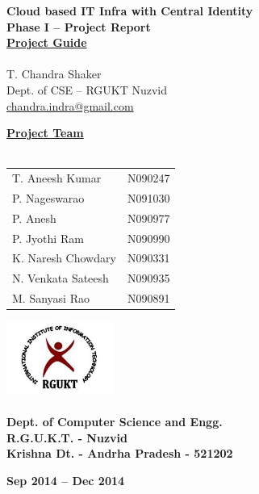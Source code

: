 \documentclass[12pt]{report}
\begin{document}
\begin{titlepage}
 \begin{center}
\LARGE
\textbf{Cloud based IT Infra with Central Identity} \\
\vfill
\textbf{Phase I -- Project Report }\\
\vfill
\Large
\underline{\textbf{Project Guide }} \\ 
\large
\underline{} \\
T. Chandra Shaker \\
\small
Dept. of CSE -- RGUKT Nuzvid \\
\small
\url{chandra.indra@gmail.com}
\vfill

\Large
\textbf{\underline{ Project Team } } \\
\underline{} \\
\large
\begin{tabular}{l  l}
T. Aneesh Kumar & N090247  \\
P. Nageswarao  & N091030  \\
P. Anesh  & N090977  \\
P. Jyothi Ram & N090990  \\
K. Naresh Chowdary  & N090331  \\
N. Venkata Sateesh  & N090935  \\
M. Sanyasi Rao & N090891 
\end{tabular}

\vfill


\includegraphics[width=3.5cm]{rgukt_logo.jpg} 
\Large
\underline{} \\
\underline{} \\
\normalsize
\textbf{Dept. of Computer Science and Engg. } \\
\textbf{R.G.U.K.T. - Nuzvid } \\
\textbf{Krishna Dt. - Andrha Pradesh - 521202}


\normalsize
\vfill
%
%

\textbf{Sep 2014 -- Dec 2014 }

\end{center}
\end{titlepage}
\end{document}
